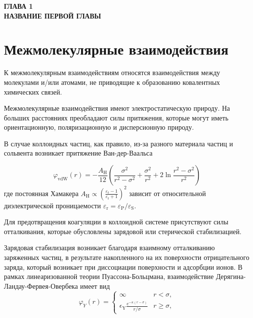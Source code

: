 
\newpage
\begin{center}
\textbf{ГЛАВА 1}\\
\textbf{НАЗВАНИЕ ПЕРВОЙ ГЛАВЫ}
\end{center}




\section{Межмолекулярные взаимодействия}\label{C1_1}

К межмолекулярным взаимодействиям относятся взаимодействия между молекулами и/или атомами, не приводящие к образованию ковалентных химических связей.

Межмолекулярные взаимодействия имеют электростатическую природу. На больших расстояниях преобладают силы притяжения, которые могут иметь ориентационную, поляризационную и дисперсионную природу.

В случае коллоидных частиц, как правило, из-за разного материала частиц и сольвента возникает притяжение Ван-дер-Ваальса \cite{Yur31, Yur53}

\begin{equation}
\varphi_{\mathrm{vdW}}(r)=-\frac{A_{\mathrm{H}}}{12}\left(\frac{\sigma^{2}}{r^{2}-\sigma^{2}}+\frac{\sigma^{2}}{r^{2}}+2 \ln \frac{r^{2}-\sigma^{2}}{r^{2}}\right)
\end{equation}
где постоянная Хамакера $A_{\mathrm{H}} \propto\left(\frac{\varepsilon_{\mathrm{r}}-1}{\varepsilon_{\mathrm{r}}+1}\right)^{2}$ зависит от относительной диэлектрической проницаемости $\varepsilon_{\mathrm{r}}=\varepsilon_{\mathrm{P}} / \varepsilon_{\mathrm{S}}$.

Для предотвращения коагуляции в коллоидной системе присутствуют силы отталкивания, которые обусловлены зарядовой или стерической стабилизацией.

Зарядовая стабилизация возникает благодаря взаимному отталкиванию заряженных частиц, в результате накопленного на их поверхности отрицательного заряда, который возникает при диссоциации поверхности и адсорбции ионов.
В рамках линеаризованной теории Пуассона-Больцмана, взаимодействие Дерягина-Ландау-Фервея-Овербека имеет вид \cite{Yur54}
\begin{equation}
\varphi_{Y}(r)=\left\{\begin{array}{ll}
\infty & r<\sigma, \\
\epsilon_{\mathrm{Y}} \frac{e^{-\kappa(r-\sigma)}}{r / \sigma} & r \geq \sigma,
\end{array}\right.
\end{equation}

